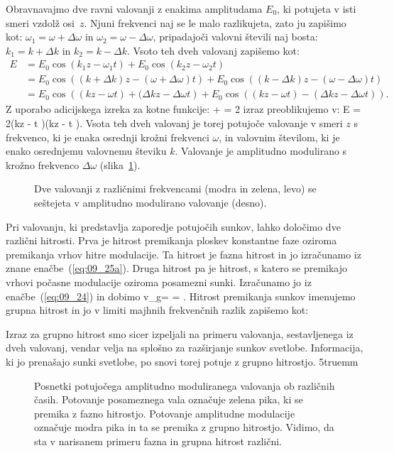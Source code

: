 Obravnavajmo dve ravni valovanji z enakima amplitudama $E_0$, ki potujeta v isti smeri vzdolž
osi~$z$. Njuni frekvenci naj se le malo razlikujeta, zato ju zapišimo kot: 
$\omega_1=\omega + \Delta \omega$ in $\omega_2=\omega - \Delta \omega$, pripadajoči
valovni števili naj bosta: $k_1 = k + \Delta k $ in $k_2 = k - \Delta k$. 
Vsoto teh dveh valovanj zapišemo kot:
\begin{align}
E &= E_0 \cos (k_1z-\omega_1 t)+ E_0 \cos (k_2z-\omega_2 t) \nonumber\\
&= E_0 \cos\left((k+\Delta k)z-(\omega + \Delta \omega)t\right) 
+ E_0 \cos\left((k-\Delta k)z-(\omega - \Delta \omega)t\right)\nonumber \\
&= E_0 \cos\left((kz - \omega t) +(\Delta k z-\Delta \omega t\right)
+ E_0 \cos\left((k z - \omega t) - (\Delta k z- \Delta \omega t)  \right)\!. 
\label{eq:09_23}
\end{align}
Z uporabo adicijskega izreka za kotne funkcije:
\beq
\cos\alpha + \cos \beta = 2 \cos {} \cos {}
\eeq
izraz preoblikujemo v:
\beq
E = 2\cos \left(kz - \omega t \right)\cos \left(\Delta kz - \Delta \omega t \right)\!.
\label{eq:09_24}
\eeq
Vsota teh dveh valovanj je torej potujoče valovanje v smeri $z$ s frekvenco, ki je 
enaka osrednji krožni frekvenci $\omega$, in valovnim številom, ki je enako 
osrednjemu valovnemu števiku $k$. Valovanje je amplitudno modulirano 
s krožno frekvenco $\Delta \omega$ (slika~\ref{fig:09_utripanje}).
\begin{figure}[ht]
\centering
\def\svgwidth{140truemm} 

\caption{Dve valovanji z različnimi frekvencami (modra in zelena, levo) se seštejeta
v amplitudno modulirano valovanje (desno).}
\label{fig:09_utripanje}
\end{figure}

Pri valovanju, ki predstavlja zaporedje potujočih sunkov, lahko določimo dve
različni hitrosti. Prva je hitrost premikanja ploskev konstantne
faze oziroma premikanja vrhov hitre modulacije. Ta hitrost je fazna hitrost in
jo izračunamo iz znane enačbe~(\ref{eq:09_25a}). Druga hitrost pa je hitrost, s katero
se premikajo vrhovi počasne modulacije oziroma posamezni sunki. Izračunamo jo
iz enačbe~(\ref{eq:09_24}) in dobimo 
\beq
v_g= = .
\eeq
Hitrost premikanja sunkov imenujemo grupna hitrost in jo 
v limiti majhnih frekvenčnih razlik zapišemo kot:

Izraz za grupno hitrost smo sicer izpeljali na primeru valovanja, sestavljenega iz dveh
valovanj, vendar velja na splošno za razširjanje sunkov svetlobe. Informacija,
ki jo prenašajo sunki svetlobe, po snovi torej potuje z grupno hitrostjo.
\vglue5truemm
\begin{figure}[ht]
\centering
\def\svgwidth{130truemm} 

\caption{Posnetki potujočega amplitudno moduliranega valovanja ob različnih časih.
Potovanje posameznega vala označuje zelena pika, ki se premika z fazno hitrostjo. Potovanje
amplitudne modulacije označuje modra pika in ta se premika z grupno 
hitrostjo. Vidimo, da sta v narisanem primeru fazna in grupna hitrost različni.}
\label{fig:09_disperzija}
\end{figure}


